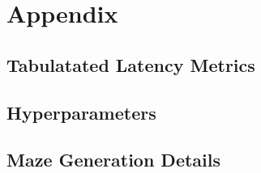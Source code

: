\section*{Appendix}

\subsection*{Tabulatated Latency Metrics}

\subsection*{Hyperparameters}

\subsection*{Maze Generation Details}




